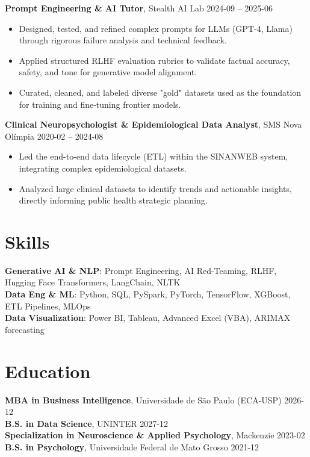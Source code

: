 \documentclass[10pt,a4paper]{article}
\begin{document}
\textbf{Prompt Engineering \& AI Tutor}, Stealth AI Lab \hfill 2024-09 -- 2025-06\\
\begin{itemize}
  \item Designed, tested, and refined complex prompts for LLMs (GPT-4, Llama) through rigorous failure analysis and technical feedback.
  \item Applied structured RLHF evaluation rubrics to validate factual accuracy, safety, and tone for generative model alignment.
  \item Curated, cleaned, and labeled diverse "gold" datasets used as the foundation for training and fine-tuning frontier models.
\end{itemize}

\textbf{Clinical Neuropsychologist \& Epidemiological Data Analyst}, SMS Nova Olímpia \hfill 2020-02 -- 2024-08\\
\begin{itemize}
  \item Led the end-to-end data lifecycle (ETL) within the SINANWEB system, integrating complex epidemiological datasets.
  \item Analyzed large clinical datasets to identify trends and actionable insights, directly informing public health strategic planning.
\end{itemize}

\section*{Skills}

\textbf{Generative AI \& NLP}: Prompt Engineering, AI Red-Teaming, RLHF, Hugging Face Transformers, LangChain, NLTK\\
\textbf{Data Eng \& ML}: Python, SQL, PySpark, PyTorch, TensorFlow, XGBoost, ETL Pipelines, MLOps\\
\textbf{Data Visualization}: Power BI, Tableau, Advanced Excel (VBA), ARIMAX forecasting\\

\section*{Education}

\textbf{MBA in Business Intelligence}, Universidade de São Paulo (ECA-USP) \hfill 2026-12\\
\textbf{B.S. in Data Science}, UNINTER \hfill 2027-12\\
\textbf{Specialization in Neuroscience \& Applied Psychology}, Mackenzie \hfill 2023-02\\
\textbf{B.S. in Psychology}, Universidade Federal de Mato Grosso \hfill 2021-12\\
\end{document}
